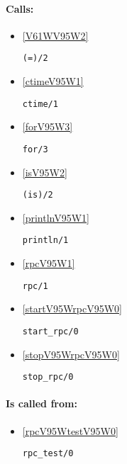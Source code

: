 \paragraph{Calls:} 
\begin{itemize}
\item \ref{V61WV95W2} 
\begin{verbatim}
(=)/2
\end{verbatim}

\item \ref{ctimeV95W1} 
\begin{verbatim}
ctime/1
\end{verbatim}

\item \ref{forV95W3} 
\begin{verbatim}
for/3
\end{verbatim}

\item \ref{isV95W2} 
\begin{verbatim}
(is)/2
\end{verbatim}

\item \ref{printlnV95W1} 
\begin{verbatim}
println/1
\end{verbatim}

\item \ref{rpcV95W1} 
\begin{verbatim}
rpc/1
\end{verbatim}

\item \ref{startV95WrpcV95W0} 
\begin{verbatim}
start_rpc/0
\end{verbatim}

\item \ref{stopV95WrpcV95W0} 
\begin{verbatim}
stop_rpc/0
\end{verbatim}

\end{itemize}
\paragraph{Is called from:} 
\begin{itemize}
\item \ref{rpcV95WtestV95W0} 
\begin{verbatim}
rpc_test/0
\end{verbatim}

\end{itemize}

